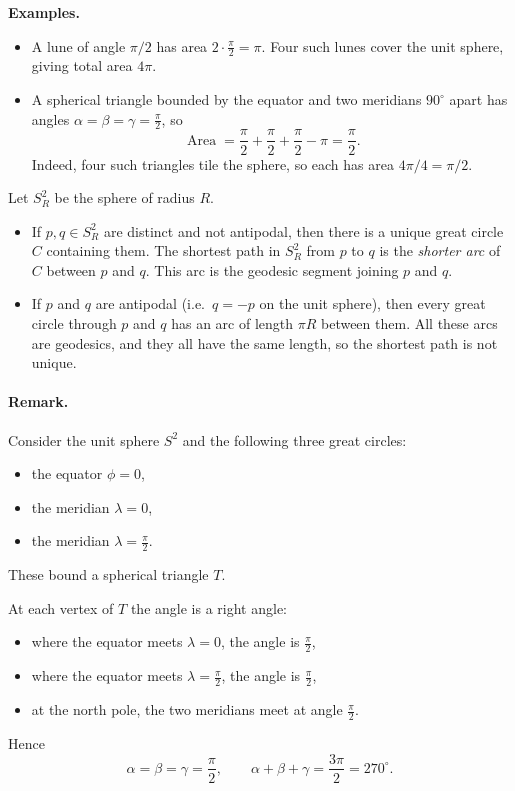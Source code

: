 \documentclass[12pt,a4paper]{article}
\theoremstyle{plain}
\theoremstyle{definition}      %
\begin{document}
\medskip
\textbf{Examples.}
\begin{itemize}
	\item A lune of angle $\pi/2$ has area $2\cdot\frac{\pi}{2}=\pi$.
	Four such lunes cover the unit sphere, giving total area $4\pi$.
	\item A spherical triangle bounded by the equator and two meridians
	$90^\circ$ apart has angles $\alpha=\beta=\gamma=\frac{\pi}{2}$, so
	\[
	\operatorname{Area} = \frac{\pi}{2}+\frac{\pi}{2}+\frac{\pi}{2}-\pi=\frac{\pi}{2}.
	\]
	Indeed, four such triangles tile the sphere, so each has area
	$4\pi/4=\pi/2$.
\end{itemize}


Let $S^2_R$ be the sphere of radius $R$.

\begin{itemize}
	\item If $p,q\in S^2_R$ are distinct and not antipodal, then there is a
	unique great circle $C$ containing them. The shortest path in $S^2_R$
	from $p$ to $q$ is the \emph{shorter arc} of $C$ between $p$ and $q$.
	This arc is the geodesic segment joining $p$ and $q$.
	
	\item If $p$ and $q$ are antipodal (i.e.\ $q=-p$ on the unit sphere),
	then every great circle through $p$ and $q$ has an arc of length $\pi R$
	between them. All these arcs are geodesics, and they all have the same
	length, so the shortest path is not unique.
\end{itemize}


\paragraph{Remark.}

Consider the unit sphere $S^2$ and the following three great circles:
\begin{itemize}
	\item the equator $\phi = 0$,
	\item the meridian $\lambda = 0$,
	\item the meridian $\lambda = \frac{\pi}{2}$.
\end{itemize}
These bound a spherical triangle $T$.

At each vertex of $T$ the angle is a right angle:
\begin{itemize}
	\item where the equator meets $\lambda=0$, the angle is $\frac{\pi}{2}$,
	\item where the equator meets $\lambda=\frac{\pi}{2}$, the angle is $\frac{\pi}{2}$,
	\item at the north pole, the two meridians meet at angle $\frac{\pi}{2}$.
\end{itemize}
Hence
\[
\alpha = \beta = \gamma = \frac{\pi}{2},
\qquad
\alpha+\beta+\gamma = \frac{3\pi}{2} = 270^\circ.
\]
\end{document}
